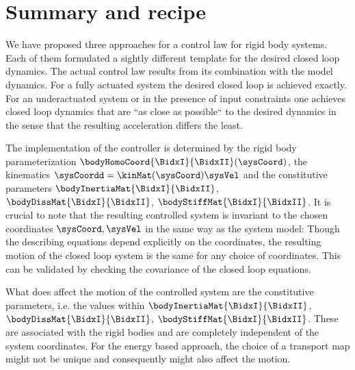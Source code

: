 \section{Summary and recipe}
We have proposed three approaches for a control law for rigid body systems.
Each of them formulated a sightly different template for the desired closed loop dynamics.
The actual control law results from its combination with the model dynamics.
For a fully actuated system the desired closed loop is achieved exactly.
For an underactuated system or in the presence of input constraints one achieves closed loop dynamics that are ``as close as possible`` to the desired dynamics in the sense that the resulting acceleration differs the least.

The implementation of the controller is determined by the rigid body parameterization $\bodyHomoCoord{\BidxI}{\BidxII}(\sysCoord)$, the kinematics $\sysCoordd = \kinMat(\sysCoord) \sysVel$ and the constitutive parameters $\bodyInertiaMat{\BidxI}{\BidxII}$, $\bodyDissMat{\BidxI}{\BidxII}$, $\bodyStiffMat{\BidxI}{\BidxII}$.
It is crucial to note that the resulting controlled system is invariant to the chosen coordinates $\sysCoord, \sysVel$ in the same way as the system model:
Though the describing equations depend explicitly on the coordinates, the resulting motion of the closed loop system is the same for any choice of coordinates.
This can be validated by checking the covariance of the closed loop equations.

What does affect the motion of the controlled system are the constitutive parameters, i.e. the values within $\bodyInertiaMat{\BidxI}{\BidxII}$, $\bodyDissMat{\BidxI}{\BidxII}$, $\bodyStiffMat{\BidxI}{\BidxII}$.
These are associated with the rigid bodies and are completely independent of the system coordinates.
For the energy based approach, the choice of a transport map might not be unique and consequently might also affect the motion.

